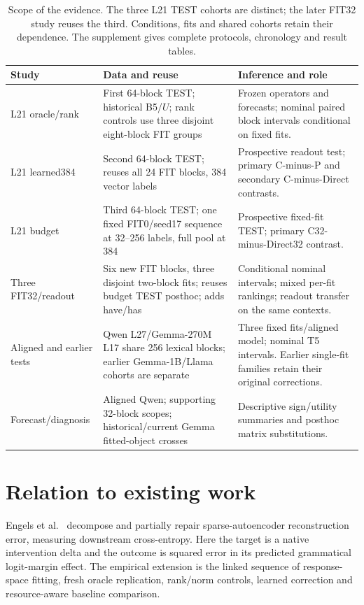 \documentclass[11pt]{article}
\begin{document}
\begin{table}[ht]\centering\scriptsize
\setlength{\tabcolsep}{4pt}
\begin{tabular}{>{\raggedright\arraybackslash}p{}>{\raggedright\arraybackslash}p{}>{\raggedright\arraybackslash}p{}}\toprule
Study & Data and reuse & Inference and role\\\midrule
L21 oracle/rank & First 64-block TEST; historical B5/$U$; rank controls use three disjoint eight-block FIT groups & Frozen operators and forecasts; nominal paired block intervals conditional on fixed fits.\\[3pt]
L21 learned384 & Second 64-block TEST; reuses all 24 FIT blocks, 384 vector labels & Prospective readout test; primary C-minus-P and secondary C-minus-Direct contrasts.\\[3pt]
L21 budget & Third 64-block TEST; one fixed FIT0/seed17 sequence at 32--256 labels, full pool at 384 & Prospective fixed-fit TEST; primary C32-minus-Direct32 contrast.\\[3pt]
Three FIT32/readout & Six new FIT blocks, three disjoint two-block fits; reuses budget TEST posthoc; adds have/has & Conditional nominal intervals; mixed per-fit rankings; readout transfer on the same contexts.\\[3pt]
Aligned and earlier tests & Qwen L27/Gemma-270M L17 share 256 lexical blocks; earlier Gemma-1B/Llama cohorts are separate & Three fixed fits/aligned model; nominal T5 intervals. Earlier single-fit families retain their original corrections.\\[3pt]
Forecast/diagnosis & Aligned Qwen; supporting 32-block scopes; historical/current Gemma fitted-object crosses & Descriptive sign/utility summaries and posthoc matrix substitutions.\\\bottomrule
\end{tabular}
\caption{Scope of the evidence. The three L21 TEST cohorts are distinct; the later FIT32 study reuses the third. Conditions, fits and shared cohorts retain their dependence. The supplement gives complete protocols, chronology and result tables.}\label{tab:scope}
\end{table}

\section{Relation to existing work}
Engels et al.~\cite{engels2024} decompose and partially repair sparse-autoencoder reconstruction error, measuring downstream cross-entropy. Here the target is a native intervention delta and the outcome is squared error in its predicted grammatical logit-margin effect. The empirical extension is the linked sequence of response-space fitting, fresh oracle replication, rank/norm controls, learned correction and resource-aware baseline comparison.
\end{document}
